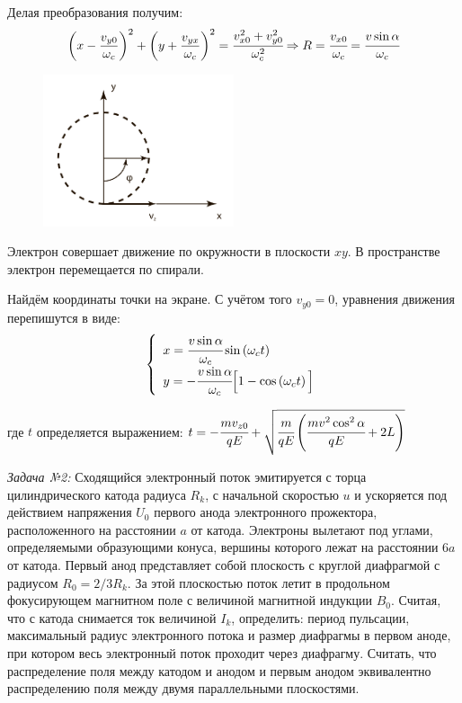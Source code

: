 Делая преобразования получим:
\[
	\left( x - \frac{v_{y0}}{\omega_c} \right)^2 + 
	\left( y + \frac{v_{yx}}{\omega_c} \right)^2 = 
	\cfrac{v^2_{x0} + v^2_{y0}}{\omega^2_c} 
	\Rightarrow R = \cfrac{v_{x0}}{\omega_c} = 
	\cfrac{v\sin\alpha}{\omega_c}
\]

\begin{figure}
    \vspace{-2ex}
    \includegraphics[width=0.5\textwidth]{images/im_02}
\end{figure}

Электрон совершает движение по окружности в плоскости \( xy \). 
В пространстве электрон перемещается по спирали.

Найдём координаты точки на экране. С учётом того \( v_{y0} = 0 \), уравнения 
движения перепишутся в виде:
\[
	\left\{ \begin{array}{ll}
		x = \cfrac{v\sin\alpha}{\omega_c}\sin\left( \omega_c t \right) \\
		y = -\cfrac{v\sin\alpha}{\omega_c}
			\Big[ 1 - \cos\left( \omega_c t \right) \Big]
	\end{array} \right.
\]

где \( t \) определяется выражением:
\(
	t = -\cfrac{mv_{z0}}{qE} + 
	\sqrt{ \cfrac{m}{qE}\left( \cfrac{mv^2\cos^2\alpha}{qE} + 2L \right)} 
\)

\pagebreak


\emph{Задача №2:} Сходящийся электронный поток эмитируется с торца 
цилиндрического катода радиуса \( R_k \), с начальной скоростью \( u \) и 
ускоряется под действием напряжения \( U_0 \) первого анода электронного 
прожектора, расположенного на расстоянии \( a \) от катода. Электроны вылетают 
под углами, определяемыми образующими конуса, вершины которого лежат на 
расстоянии \( 6a \) от катода. Первый анод представляет собой плоскость с 
круглой диафрагмой с радиусом \( R_0 = 2/3 R_k \). За этой плоскостью поток 
летит в продольном фокусирующем магнитном поле с величиной магнитной индукции 
\( B_0 \). Считая, что с катода снимается ток величиной \( I_k \), определить: 
период пульсации, максимальный радиус электронного потока и размер диафрагмы в 
первом аноде, при котором весь электронный поток проходит через диафрагму. 
Считать, что распределение поля между катодом и анодом и первым анодом 
эквивалентно распределению поля между двумя параллельными плоскостями.

